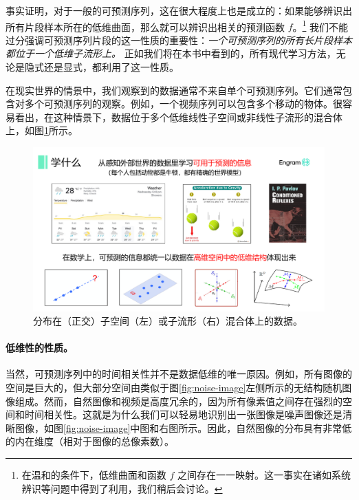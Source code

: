 \documentclass[../../book-main.tex]{subfiles}
\begin{document}
事实证明，对于一般的可预测序列，这在很大程度上也是成立的：如果能够辨识出所有片段样本所在的低维曲面，那么就可以辨识出相关的预测函数 $f$。\footnote{在温和的条件下，低维曲面和函数 $f$ 之间存在一一映射。这一事实在诸如系统辨识等问题中得到了利用，我们稍后会讨论。} 我们不能过分强调可预测序列片段的这一性质的重要性：{\em 一个可预测序列的所有长片段样本都位于一个低维子流形上。} 正如我们将在本书中看到的，所有现代学习方法，无论是隐式还是显式，都利用了这一性质。%

在现实世界的情景中，我们观察到的数据通常不来自单个可预测序列。它们通常包含对多个可预测序列的观察。例如，一个视频序列可以包含多个移动的物体。很容易看出，在这种情景下，数据位于多个低维线性子空间或非线性子流形的混合体上，如图\ref{fig:mixture-models}所示。
\begin{figure}
    \centering
    \includegraphics[width=0.8\linewidth]{figures/mixture.pdf}
    \caption{分布在（正交）子空间（左）或子流形（右）混合体上的数据。}
    \label{fig:mixture-models}
\end{figure}


\paragraph{低维性的性质。}
当然，可预测序列中的时间相关性并不是数据低维的唯一原因。例如，所有图像的空间是巨大的，但大部分空间由类似于图\ref{fig:noise-image}左侧所示的无结构随机图像组成。然而，自然图像和视频是高度冗余的，因为所有像素值之间存在强烈的空间和时间相关性。这就是为什么我们可以轻易地识别出一张图像是噪声图像还是清晰图像，如图\ref{fig:noise-image}中图和右图所示。因此，自然图像的分布具有非常低的内在维度（相对于图像的总像素数）。
\end{document}
